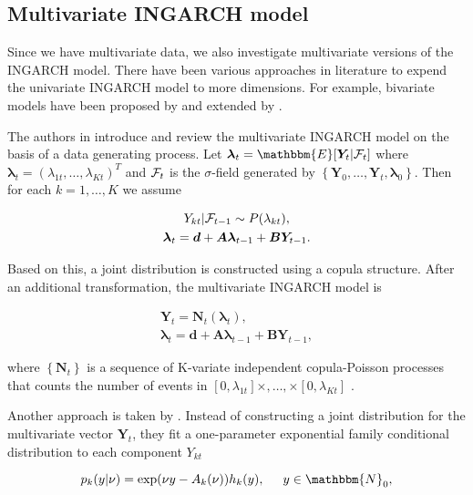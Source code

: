 \subsection{Multivariate INGARCH model}
\label{sec: Multivariate Ingarch}

Since we have multivariate data, we also investigate multivariate versions of the INGARCH model. There have been various approaches in literature to expend the univariate INGARCH model to more dimensions. For example, bivariate models have been proposed by \cite{Liu:2012} and  extended by \cite{Cui:2018}. 

The authors in \cite{Fokianos:2020,Fokianos:2021} introduce and review the multivariate INGARCH model on the basis of a data generating process. Let $\bm{\lambda}_t=\mathbbm{E}[\bm{Y}_t|\SigA_t]$ where $\bm{\lambda}_t = (\lambda_{1t},\ldots,\lambda_{Kt})^T$ and $\mathcal{F}_t$ is the $\sigma$-field generated by $\left\{\bm{Y}_0,\ldots,\bm{Y}_t,\bm{\lambda}_0\right\}$. Then for each $k=1,\ldots,K$ we assume

\begin{gather}
Y_{kt} | \mathcal{F}_{t-1} \sim P(\lambda_{kt}), \\
\bm{\lambda}_t = \bm{d} + \bm{A}\bm{\lambda}_{t-1} + \bm{B}\bm{Y}_{t-1}.
\label{eq:Mingarch 1}
\end{gather}

Based on this, a joint distribution is constructed using a copula structure. After an additional transformation, the multivariate INGARCH model is

\begin{gather}
\bm{Y}_t = \bm{N}_t(\bm{\lambda}_t), \\
\bm{\lambda}_t = \bm{d} + \bm{A}\bm{\lambda}_{t-1} + \bm{B}\bm{Y}_{t-1},
\label{eq:Mingarch 1 new}
\end{gather}

where $\left\{\bm{N}_t\right\}$ is a sequence of K-variate independent copula-Poisson processes that counts the number of events in $[0,\lambda_{1t}]\times,\ldots,\times[0,\lambda_{Kt}]$ \cite{Fokianos:2020}. 

Another approach is taken by \cite{Lee:2023}. Instead of constructing a joint distribution for the multivariate vector $\bm{Y}_t$, they fit a one-parameter exponential family conditional distribution to each component $Y_{kt}$

\begin{equation}
p_{k}(y|\nu) = \exp(\nu y - A_k(\nu))h_k(y), \hspace{0.5cm} y \in \mathbbm{N}_0,
\label{eq:Exponential Family}
\end{equation}

